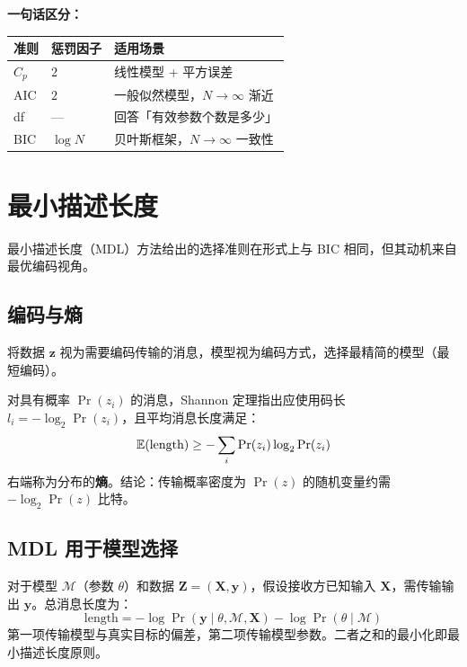 \textbf{一句话区分：}
\begin{center}
\begin{tabular}{lll}
\toprule
准则 & 惩罚因子 & 适用场景 \\
\midrule
$C_p$   & $2$     & 线性模型 + 平方误差 \\
AIC   & $2$     & 一般似然模型，$N\to\infty$ 渐近 \\
df    & —       & 回答「有效参数个数是多少」 \\
BIC   & $\log N$ & 贝叶斯框架，$N\to\infty$ 一致性 \\
\bottomrule
\end{tabular}
\end{center}

\section{最小描述长度}

最小描述长度（MDL）方法给出的选择准则在形式上与 BIC 相同，但其动机来自最优编码视角。

\subsection{编码与熵}

将数据 $\mathbf{z}$ 视为需要编码传输的消息，模型视为编码方式，选择最精简的模型（最短编码）。

对具有概率 $\Pr(z_i)$ 的消息，Shannon 定理指出应使用码长 $l_i = -\log_2 \Pr(z_i)$，且平均消息长度满足：
\begin{equation}\label{eq:shannon}
    \mathbb{E}(\text{length}) \geq -\sum_i \Pr(z_i)\log_2\Pr(z_i)
\end{equation}
右端称为分布的\textbf{熵}。结论：传输概率密度为 $\Pr(z)$ 的随机变量约需 $-\log_2\Pr(z)$ 比特。

\subsection{MDL 用于模型选择}

对于模型 $\mathcal{M}$（参数 $\theta$）和数据 $\mathbf{Z} = (\mathbf{X}, \mathbf{y})$，假设接收方已知输入 $\mathbf{X}$，需传输输出 $\mathbf{y}$。总消息长度为：
\begin{equation}\label{eq:MDL_length}
    \text{length} = -\log\Pr(\mathbf{y} \mid \theta, \mathcal{M}, \mathbf{X}) - \log\Pr(\theta \mid \mathcal{M})
\end{equation}
第一项传输模型与真实目标的偏差，第二项传输模型参数。二者之和的最小化即最小描述长度原则。

